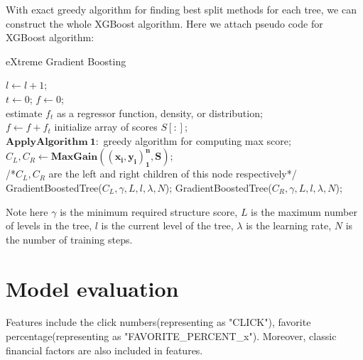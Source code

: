 \documentclass[letterpaper]{article}
\begin{document}
With exact greedy algorithm for finding best split methods for each tree, we can construct the whole XGBoost algorithm. Here we attach pseudo code for XGBoost algorithm:

\begin{algorithm}[htbp]
            \caption{eXtreme Gradient Boosting}
            $l \gets l + 1$;\\
            { 
            $t \gets 0$; $f \gets 0$;\\
                { 
                    estimate $f_t$ as a regressor function, density, or distribution;\\
                    $f \gets f + f_t$
                }
                initialize array of scores $S[:]$;\\
                $\bm{Apply Algorithm\ 1:}$ greedy algorithm for computing max score;\\
                $C_L, C_R \gets \bm{MaxGain\left((x_i, y_i)_1^n, S\right)}$;\\
                /*$C_L, C_R$ are the left and right children of this node respectively*/\\
                {
                GradientBoostedTree($C_L, \gamma, L, l, \lambda, N$);
                }
                {
                GradientBoostedTree($C_R, \gamma, L, l, \lambda, N$);
                }
            } 
\end{algorithm}

Note here $\gamma$ is the minimum required structure score, $L$ is the maximum number of levels in the tree, $l$ is the current level of the tree, $\lambda$ is the learning rate, $N$ is the number of training steps.

\section{Model evaluation}
\label{model_evaluation}

Features include the click numbers(representing as "CLICK"), favorite percentage(representing as "FAVORITE\_PERCENT\_x"). Moreover, classic financial factors are also included in features. 
\end{document}
